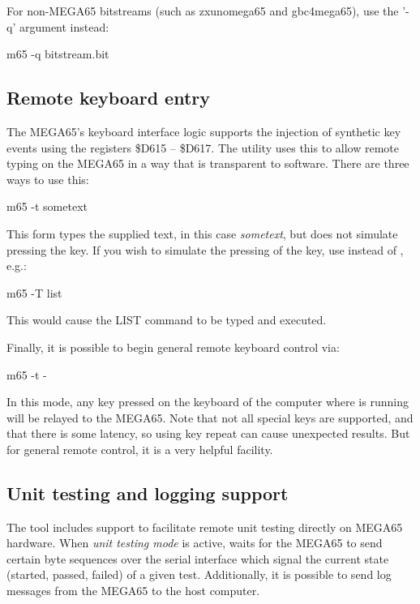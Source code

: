 For non-MEGA65 bitstreams (such as zxunomega65 and gbc4mega65), use the '-q' argument instead:

\begin{screenoutput}
m65 -q bitstream.bit
\end{screenoutput}

\subsection{Remote keyboard entry}

The MEGA65's keyboard interface logic supports the injection of
synthetic key events using the registers \$D615 -- \$D617.
The  utility uses this to allow remote typing on the MEGA65
in a way that is transparent to software.  There are three ways to use
this:

\begin{screenoutput}
m65 -t sometext
\end{screenoutput}

This form types the supplied text, in this case {\em sometext}, but
does not simulate pressing the  key.  If you wish
to simulate the pressing of the  key, use 
instead of , e.g.:

\begin{screenoutput}
m65 -T list
\end{screenoutput}

This would cause the LIST command to be typed and executed.

Finally, it is possible to begin general remote keyboard control via:

\begin{screenoutput}
m65 -t -
\end{screenoutput}

In this mode, any key pressed on the keyboard of the computer
where  is running will be relayed to the MEGA65.  Note that
not all special keys are supported, and that there is some latency, so
using key repeat can cause unexpected results.  But for general remote
control, it is a very helpful facility.

\subsection{Unit testing and logging support}

The  tool includes support to facilitate remote unit testing 
directly on MEGA65 hardware. When \textit{unit testing mode} is active, 
 waits for the MEGA65 to send certain byte sequences over the 
serial interface which signal the current state (started, passed, failed) 
of a given test. Additionally, it is possible to send log messages from 
the MEGA65 to the host computer.

